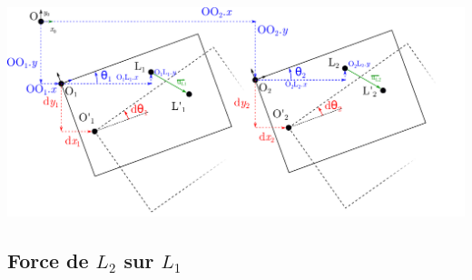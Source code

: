 \documentclass[a4paper,10pt]{article}
\begin{document}
	
	\begin{center}
        \includegraphics[width=\linewidth]{pivot.pdf}
	\end{center}

	
	
	\subsection{Force de $L_2$ sur $L_1$}
	
\end{document}
